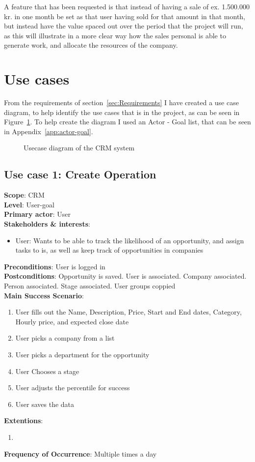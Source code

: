 A feature that has been requested is that instead of having a sale of ex. 1.500.000 kr. in one month be set as that user having sold for that amount in that month, but instead have the value spaced out over the period that the project will run, as this will illustrate in a more clear way how the sales personal is able to generate work, and allocate the resources of the company.

\section{Use cases}
\label{sec:Use cases}
From the requirements of section~\ref{sec:Requirements} I have created a use case diagram, to help identify the use cases that is in the project, as can be seen in Figure~\ref{fig:usecase}. To help create the diagram I used an Actor - Goal list, that can be seen in Appendix~\ref{app:actor-goal}.

\begin{figure}[h]
  \centering
  \caption{Usecase diagram of the CRM system}
  \label{fig:usecase}
\end{figure}

\subsection{Use case 1: Create Operation}
\textbf{Scope}: CRM \\
\textbf{Level}: User-goal \\
\textbf{Primary actor}: User \\
\textbf{Stakeholders \& interests}:
\begin{itemize}
  \item User: Wants to be able to track the likelihood of an opportunity, and assign tasks to is, as well as keep track of opportunities in companies
\end{itemize}
\textbf{Preconditions}: User is logged in \\
\textbf{Postconditions}: Opportunity is saved. User is associated. Company associated. Person associated. Stage associated. User groups coppied\\
\textbf{Main Success Scenario}:
\begin{enumerate}
  \item User fills out the Name, Description, Price, Start and End dates, Category, Hourly price, and expected close date
  \item User picks a company from a list
  \item User picks a department for the opportunity
  \item User Chooses a stage
  \item User adjusts the percentile for success
  \item User saves the data
\end{enumerate}
\textbf{Extentions}:
\begin{enumerate}
  \item
\end{enumerate}
\textbf{Frequency of Occurrence}: Multiple times a day



